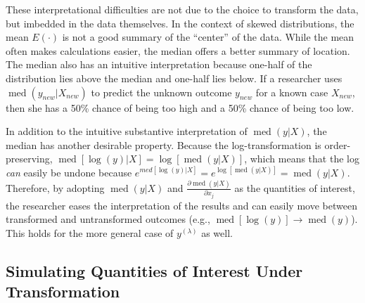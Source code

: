 \documentclass[12pt]{article}
\DeclareMathOperator{\med}{med}
\begin{document}
These interpretational difficulties are not due to the choice to transform the data, but imbedded in the data themselves. 
In the context of skewed distributions, the mean $E(\cdot)$ is not a good summary of the ``center'' of the data. 
While the mean often makes calculations easier, the median offers a better summary of location. 
The median also has an intuitive interpretation because one-half of the distribution lies above the median and one-half lies below. 
If a researcher uses $\med(y_{new} | X_{new})$ to predict the unknown outcome $y_{new}$ for a known case $X_{new}$, then she has a 50\% chance of being too high and a 50\% chance of being too low. 

In addition to the intuitive substantive interpretation of $\med(y | X)$, the median has another desirable property. 
Because the log-transformation is order-preserving, $\med[\log(y) | X] = \log [\med(y | X)]$, which means that the log \textit{can} easily be undone because $e^{med[\log(y) | X]} = e^{\log[\med(y | X)]} = \med(y | X)$. 
Therefore, by adopting $\med(y | X)$ and $\frac{\partial \med(y | X)}{\partial x_j}$ as the quantities of interest, the researcher eases the interpretation of the results and can easily move between transformed and untransformed outcomes (e.g., $\med[\log(y)] \rightarrow \med(y)$). 
This holds for the more general case of $y^{(\lambda)}$ as well.

\subsection*{Simulating Quantities of Interest Under Transformation}
\end{document}
